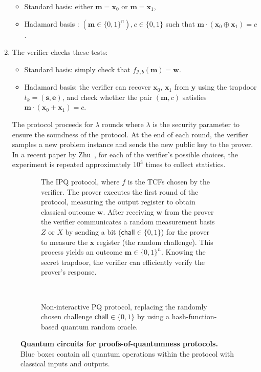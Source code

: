 \documentclass[cryptography,review,submit,pdftex,moreauthors,amsmath,amssymb,aps,strict]{Definitions/mdpi}
\begin{document}
\begin{enumerate}
\begin{itemize}
        \item Standard basis: either $\mathbf{m}=\mathbf{x}_0$ or $\mathbf{m}=\mathbf{x}_1$, 
        \item Hadamard basis : $(\mathbf{m}\in\{0,1\}^n),c\in\{0,1\}$ such that $\mathbf{m}\cdot(\mathbf{x}_0\oplus\mathbf{x}_1)=c$.
    \end{itemize}
    \item The verifier checks these tests: 
    \begin{itemize}
        \item Standard basis: simply check that $f_{\mathcal{I},b}(\mathbf{m})=\mathbf{w}$.
        \item Hadamard basis: the verifier can recover $\mathbf{x}_0$, $\mathbf{x}_1$ from $\mathbf{y}$ using the trapdoor $t_k=(\mathbf{s},\mathbf{e})$, and check whether the pair $(\mathbf{m},c)$ satisfies $\mathbf{m}\cdot(\mathbf{x}_0+\mathbf{x}_1)=c$.
    \end{itemize}

The protocol proceeds for $\lambda$ rounds where $\lambda$ is the security parameter to ensure the soundness of the protocol. At the end of each round, the verifier samples a new problem instance and sends the new public key to the prover.
In a recent paper by Zhu~\cite{experiment_interactive_PoQ}, for each of the verifier’s possible choices, the experiment is repeated approximately $10^3$ times to collect statistics. 
\end{enumerate}

\begin{figure}[!htp]
	\centering
	\begin{subfigure}[c]{\linewidth}
			
			\caption{The IPQ protocol, where $f$ is the TCFs chosen by the verifier. The prover executes the first round of the protocol, measuring the output register to obtain classical outcome $\mathbf{w}$. After receiving $\mathbf{w}$ from the prover the verifier communicates a random measurement basis $Z$ or $X$ by sending a bit ($\mathsf{chall}\in\{0,1\}$) for the prover to measure the $\mathbf{x}$ register (the random challenge). This process yields an outcome $\mathbf{m}\in\{0,1\}^n$. Knowing the secret trapdoor, the verifier can efficiently verify the prover's response.}
	\end{subfigure}\label{fig:ipqlwe}
 \\
	\begin{subfigure}[c]{\linewidth}
		
		\caption{Non-interactive PQ protocol, replacing the randomly chosen challenge $\mathsf{chall}\in\{0,1\}$ by using a hash-function-based quantum random oracle.}
	\end{subfigure}\label{fig:ipqrlwe}
	\caption{\textbf{Quantum circuits for proofs-of-quantumness protocols.} \\Blue boxes contain all quantum operations within the protocol with classical inputs and outputs.} \label{fig:IPQ_circuit.tex}
\end{figure}
\end{document}

